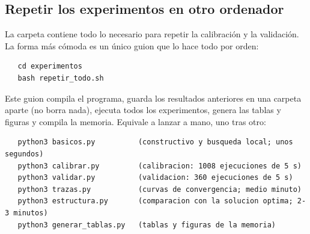 \subsection{Repetir los experimentos en otro ordenador}

La carpeta  contiene todo lo necesario para repetir la calibración y la
validación. La forma más cómoda es un único guion que lo hace todo por orden:
\begin{verbatim}
   cd experimentos
   bash repetir_todo.sh
\end{verbatim}
Este guion compila el programa, guarda los resultados anteriores en una carpeta aparte (no
borra nada), ejecuta todos los experimentos, genera las
tablas y figuras y compila la memoria. Equivale a lanzar a mano, uno tras otro:
\begin{verbatim}
   python3 basicos.py          (constructivo y busqueda local; unos segundos)
   python3 calibrar.py         (calibracion: 1008 ejecuciones de 5 s)
   python3 validar.py          (validacion: 360 ejecuciones de 5 s)
   python3 trazas.py           (curvas de convergencia; medio minuto)
   python3 estructura.py       (comparacion con la solucion optima; 2-3 minutos)
   python3 generar_tablas.py   (tablas y figuras de la memoria)
\end{verbatim}
